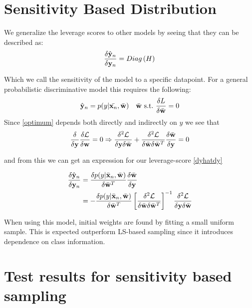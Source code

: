 \documentclass{article}
\begin{document}
\section{Sensitivity Based Distribution}

We generalize the leverage scores to other models by seeing that they can be described as: 
	    \begin{equation}
	    \label{dyhatdy}
	    \frac{\delta \hat{{\bf y}}_n}{\delta {\bf y}_n} = Diag\left(H\right)
	    \end{equation}

Which we call the sensitivity of the model to a specific datapoint. For a general probabilistic discriminative model this requires the following:
    	\begin{equation}
    	 \hat{{\bf y}}_n = p(y|\bar{{\bf x}_n},\bar{{\bf w}}) \quad \bar{{\bf w}} \  \text{s.t.} \ \frac{\delta L}{\delta\bar{{\bf w}}}=0     	\label{optimum}
    	\end{equation}
Since \eqref{optimum} depends both directly and indirectly on $y$ we see that
    	\begin{equation}
    	\frac{\delta}{\delta {\bf y}} \frac{\delta \mathcal{L}}{\delta {\bf w}} = 0 
    	\Rightarrow
    	\frac{\delta^2 \mathcal{L}}{\delta {\bf y} \delta \bar{{\bf w}}} + \frac{\delta^2 \mathcal{L}}{\delta \bar{{\bf w}} \delta \bar{{\bf w}}^T} \frac{\delta \bar{{\bf w}}}{\delta {\bf y}}= 0
    	\end{equation}
    	
    	and from this we can get an expression for our leverage-score \eqref{dyhatdy}
    	
    	\begin{align}
    		\frac{\delta \hat{{\bf y}}_n}{\delta {\bf y}_n}&=\frac{\delta p(y|\bar{{\bf x}}_n,\bar{{\bf w}})}{\delta \bar{{\bf w}}^T} \frac{\delta \bar{{\bf w}}}{\delta {\bf y}} \nonumber \\
    		&= - \frac{\delta p(y|\bar{{\bf x}}_n,\bar{{\bf w}})}{\delta \bar{{\bf w}}^T} \left[ \frac{\delta^2 \mathcal{L}}{\delta \bar{{\bf w}} \delta \bar{{\bf w}}^T} \right]^{-1} \frac{\delta^2 \mathcal{L}}{\delta {\bf y} \delta \bar{{\bf w}}} \label{eq:sen}
    	\end{align}
    	
    	When using this model, initial weights are found by fitting a small uniform sample. This is expected outperform LS-based sampling since it introduces dependence on class information.
%



\section{Test results for sensitivity based sampling}
\end{document}
